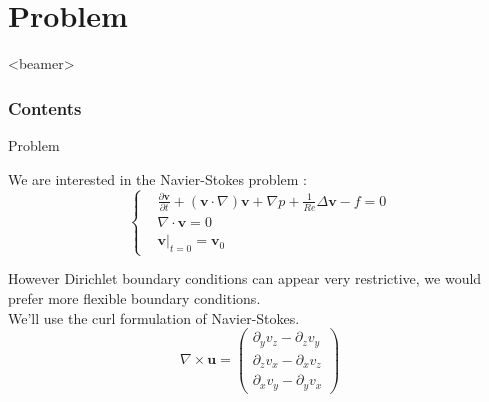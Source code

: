 \documentclass{beamer}
\newcommand{\grad}{{\nabla}}
\newcommand{\laplace}{{\Delta}}
\newcommand{\curl}{{\nabla\times}}
\renewcommand{\div}{{\nabla\cdot}}
\begin{document}
\section{Problem}
\begin{frame}<beamer>
  \frametitle{Contents}
  \tableofcontents[currentsection]
\end{frame}

\begin{frame}{Problem}
  \begin{block}{We are interested in the Navier-Stokes problem :}
    \[ \left\{
    \begin{aligned}
      &\frac{\partial\mathbf{v}}{\partial t} + (\mathbf{v}\cdot\grad)\mathbf{v} + \grad p + \frac{1}{Re}\laplace\mathbf{v} -f = 0\\
      &\div\mathbf{v} = 0\\
      &\mathbf{v}\big\rvert_{t=0} = \mathbf{v}_0
    \end{aligned}
    \right.\]
  \end{block}
  However Dirichlet boundary conditions can appear very restrictive, we would prefer more flexible boundary conditions.\\
  We'll use the curl formulation of Navier-Stokes.\\
  \[ \curl\mathbf{u} = \begin{pmatrix}
    \partial_y v_z - \partial_z v_y\\
    \partial_z v_x - \partial_x v_z\\
    \partial_x v_y - \partial_y v_x
  \end{pmatrix} \]
\end{frame}
\end{document}

